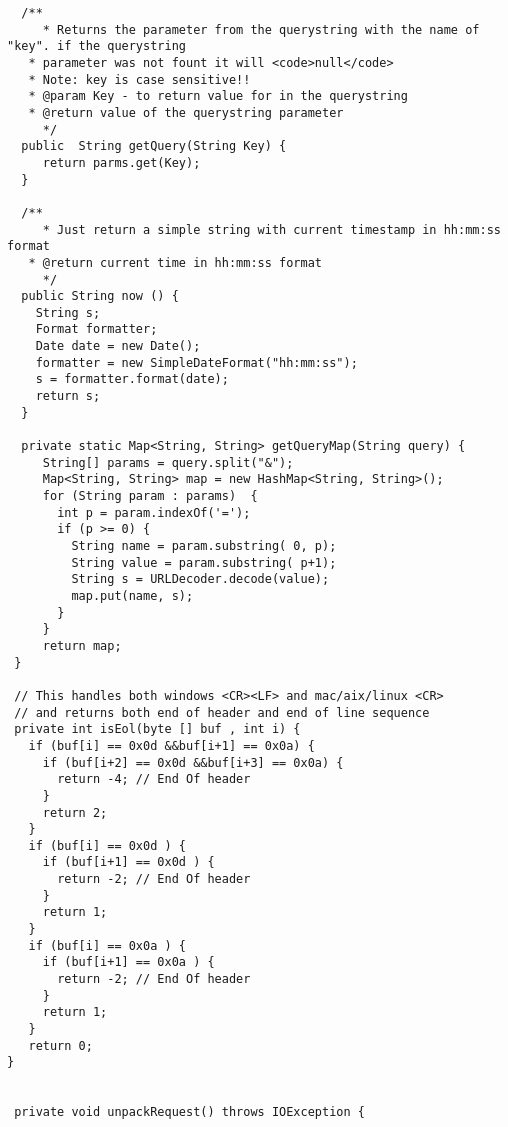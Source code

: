 \begin{lstlisting}
  /**
	 * Returns the parameter from the querystring with the name of "key". if the querystring
   * parameter was not fount it will <code>null</code>
   * Note: key is case sensitive!!
   * @param Key - to return value for in the querystring
   * @return value of the querystring parameter
	 */
  public  String getQuery(String Key) {
     return parms.get(Key);
  }

  /**
	 * Just return a simple string with current timestamp in hh:mm:ss format
   * @return current time in hh:mm:ss format
	 */
  public String now () {
    String s;
    Format formatter;
    Date date = new Date();
    formatter = new SimpleDateFormat("hh:mm:ss");
    s = formatter.format(date);
    return s;
  }

  private static Map<String, String> getQueryMap(String query) {
     String[] params = query.split("&");  
     Map<String, String> map = new HashMap<String, String>();  
     for (String param : params)  {  
       int p = param.indexOf('=');
       if (p >= 0) {
         String name = param.substring( 0, p);
         String value = param.substring( p+1);
         String s = URLDecoder.decode(value);
         map.put(name, s);
       }
     }  
     return map;  
 }

 // This handles both windows <CR><LF> and mac/aix/linux <CR>
 // and returns both end of header and end of line sequence
 private int isEol(byte [] buf , int i) {
   if (buf[i] == 0x0d &&buf[i+1] == 0x0a) {
     if (buf[i+2] == 0x0d &&buf[i+3] == 0x0a) {
       return -4; // End Of header
     }
     return 2;
   }
   if (buf[i] == 0x0d ) {
     if (buf[i+1] == 0x0d ) {
       return -2; // End Of header
     }
     return 1;
   }
   if (buf[i] == 0x0a ) {
     if (buf[i+1] == 0x0a ) {
       return -2; // End Of header
     }
     return 1;
   }
   return 0;
}


 private void unpackRequest() throws IOException {


\end{lstlisting}
